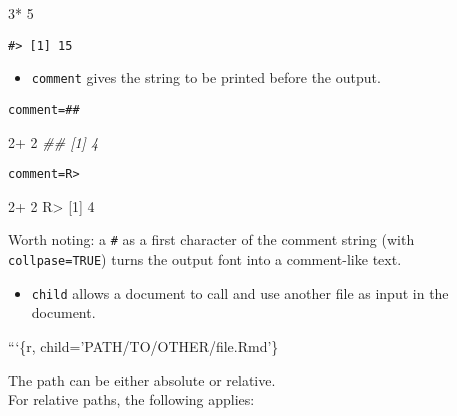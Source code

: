 \documentclass[]{book}
\newenvironment{Shaded}{}{}
\newcommand{\BaseNTok}[1]{\textcolor[rgb]{0.25,0.63,0.44}{#1}}
\newcommand{\CommentTok}[1]{\textcolor[rgb]{0.38,0.63,0.69}{\textit{#1}}}
\newcommand{\DecValTok}[1]{\textcolor[rgb]{0.25,0.63,0.44}{#1}}
\newcommand{\NormalTok}[1]{#1}
\newcommand{\OperatorTok}[1]{\textcolor[rgb]{0.40,0.40,0.40}{#1}}
\newcommand{\StringTok}[1]{\textcolor[rgb]{0.25,0.44,0.63}{#1}}
\providecommand{\tightlist}{%
  \setlength{\itemsep}{0pt}\setlength{\parskip}{0pt}}
\theoremstyle{definition}
\theoremstyle{definition}
\theoremstyle{definition}
\theoremstyle{remark}
\begin{document}
\begin{Shaded}
\begin{Highlighting}[]
\DecValTok{3}\OperatorTok{*}\StringTok{ }\DecValTok{5}
\end{Highlighting}
\end{Shaded}

\begin{verbatim}
#> [1] 15
\end{verbatim}

\begin{itemize}
\tightlist
\item
  \texttt{comment} gives the string to be printed before the output.
\end{itemize}

\texttt{comment=\textquotesingle{}\#\#\textquotesingle{}}

\begin{Shaded}
\begin{Highlighting}[]
\DecValTok{2}\OperatorTok{+}\StringTok{ }\DecValTok{2}
\CommentTok{## [1] 4}
\end{Highlighting}
\end{Shaded}

\texttt{comment=\textquotesingle{}R\textgreater{}\textquotesingle{}}

\begin{Shaded}
\begin{Highlighting}[]
\DecValTok{2}\OperatorTok{+}\StringTok{ }\DecValTok{2}
\NormalTok{R}\OperatorTok{>}\StringTok{ }\NormalTok{[}\DecValTok{1}\NormalTok{] }\DecValTok{4}
\end{Highlighting}
\end{Shaded}

Worth noting: a \texttt{\#} as a first character of the comment string
(with \texttt{collpase=TRUE}) turns the output font into a comment-like
text.

\begin{itemize}
\tightlist
\item
  \texttt{child} allows a document to call and use another file as input
  in the document.
\end{itemize}

\begin{Shaded}
\begin{Highlighting}[]
\BaseNTok{```\{r, child='PATH/TO/OTHER/file.Rmd'\}}
\end{Highlighting}
\end{Shaded}

The path can be either absolute or relative.\\
For relative paths, the following applies:
\end{document}
